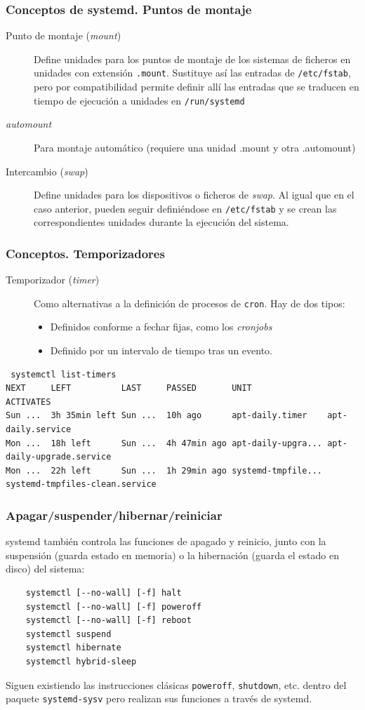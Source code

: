 \documentclass[aspectratio=169]{beamer}
\begin{document}
\begin{frame}[fragile]
  \frametitle{Conceptos de systemd. Puntos de montaje}
  \begin{description}
  \item [Punto de montaje (\textit{mount})] Define unidades para los puntos de montaje de los sistemas de ficheros en unidades con extensión \texttt{.mount}. Sustituye así las entradas de \texttt{/etc/fstab}, pero por compatibilidad permite definir allí las entradas que se traducen en tiempo de ejecución a unidades en \texttt{/run/systemd}
  \item [\textit{automount}] Para montaje automático (requiere una unidad .mount y otra .automount)
  \item[Intercambio (\textit{swap})] Define unidades para los dispositivos o ficheros de \textit{swap}. Al igual que en el caso anterior, pueden seguir definiéndose en \texttt{/etc/fstab} y se crean las correspondientes unidades durante la ejecución del sistema.
  \end{description}
\end{frame}

\begin{frame}[fragile]
  \frametitle{Conceptos. Temporizadores}
  \begin{description}
  \item[Temporizador (\textit{timer})] Como alternativas a la definición de procesos de \texttt{cron}. Hay de dos tipos:
    \begin{itemize}
    \item Definidos conforme a fechar fijas, como los \textit{cronjobs}
    \item Definido por un intervalo de tiempo tras un evento.
    \end{itemize}
  \end{description}
  \begin{lstlisting}
 systemctl list-timers
NEXT     LEFT          LAST     PASSED       UNIT               ACTIVATES
Sun ...  3h 35min left Sun ...  10h ago      apt-daily.timer    apt-daily.service
Mon ...  18h left      Sun ...  4h 47min ago apt-daily-upgra... apt-daily-upgrade.service
Mon ...  22h left      Sun ...  1h 29min ago systemd-tmpfile... systemd-tmpfiles-clean.service
  \end{lstlisting}
\end{frame}

\begin{frame}[fragile]
  \frametitle{Apagar/suspender/hibernar/reiniciar}
  systemd también controla las funciones de apagado y reinicio, junto con la suspensión (guarda estado en memoria) o la hibernación (guarda el estado en disco) del sistema:
  \begin{lstlisting}
    systemctl [--no-wall] [-f] halt 
    systemctl [--no-wall] [-f] poweroff 
    systemctl [--no-wall] [-f] reboot
    systemctl suspend
    systemctl hibernate
    systemctl hybrid-sleep
  \end{lstlisting}
  Siguen existiendo las instrucciones clásicas \texttt{poweroff}, \texttt{shutdown}, etc. dentro del paquete \texttt{systemd-sysv} pero realizan sus funciones a través de systemd.
\end{frame}
\end{document}
